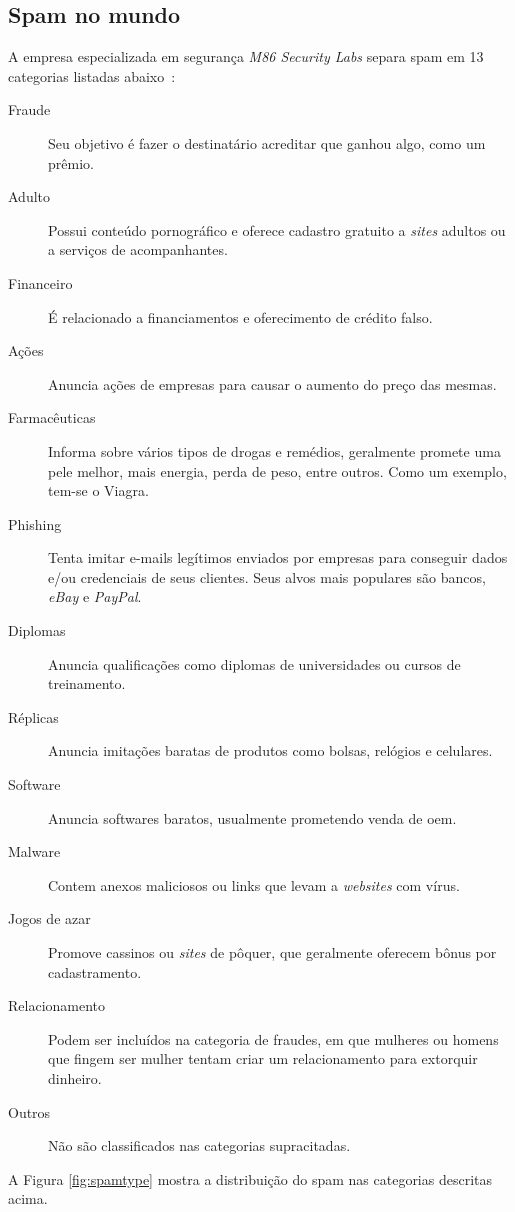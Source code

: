 \documentclass[a4paper,dvipdfm]{article}
\begin{document}
	\subsection{Spam no mundo}
		A empresa especializada em segurança \emph{M86 Security Labs} separa spam em 13 categorias listadas abaixo~\cite{spam:m86-type}:
		\begin{description}
			\item [Fraude] Seu objetivo é fazer o destinatário acreditar que ganhou algo, como um prêmio.
			\item [Adulto] Possui conteúdo pornográfico e oferece cadastro gratuito a \emph{sites} adultos ou a serviços de acompanhantes.
			\item [Financeiro] É relacionado a financiamentos e oferecimento de crédito falso.
			\item [Ações] Anuncia ações de empresas para causar o aumento do preço das mesmas.
			\item [Farmacêuticas] Informa sobre vários tipos de drogas e remédios, geralmente promete uma pele melhor, mais energia, perda de peso, entre outros. 
			Como um exemplo, tem-se o Viagra.
			\item [Phishing] Tenta imitar e-mails legítimos enviados por empresas para conseguir dados e/ou credenciais de seus clientes.
			Seus alvos mais populares são bancos, \emph{eBay} e \emph{PayPal}.
			\item [Diplomas] Anuncia qualificações como diplomas de universidades ou cursos de treinamento.
			\item [Réplicas] Anuncia imitações baratas de produtos como bolsas, relógios e celulares.
			\item [Software] Anuncia softwares baratos, usualmente prometendo venda de \gls{oem}.
			\item [Malware] Contem anexos maliciosos ou \glspl{link} que levam a \emph{websites} com vírus.
			\item [Jogos de azar] Promove cassinos ou \emph{sites} de pôquer, que geralmente oferecem bônus por cadastramento.
			\item [Relacionamento] Podem ser incluídos na categoria de fraudes, em que mulheres ou homens que fingem ser mulher tentam criar um relacionamento para extorquir dinheiro.
			\item [Outros] Não são classificados nas categorias supracitadas.
		\end{description}

		A Figura \ref{fig:spamtype} mostra a distribuição do spam nas categorias descritas acima.
\end{document}
